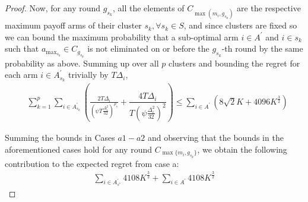\begin{proof}
  Now, for any round $g_{s_{k}}$, all the elements of $C_{\max(m_{i},g_{s_{k}})}$ are the respective maximum payoff arms of their cluster $s_{k}, \forall s_{k}\in S$, and since clusters are fixed so we can bound the maximum probability that a sub-optimal arm ${i}\in A^{'}$  and ${i}\in s_{k}$ such that $a_{\max_{s_{k}}}\in C_{g_{s_{k}}}$ is not eliminated on or before the $g_{s_{k}}$-th round by the same probability as above. Summing up over all $p$ clusters and bounding the regret for each arm $i\in A_{s_{k}}^{'}$ trivially by $T\Delta_{i}$,
 \begin{align*}
 &\sum_{k=1}^{p}\sum_{i\in A_{s_{k}}^{'}}\left(\frac{2T\Delta_{i}}{(\psi T\frac{\Delta_{i}^{2}}{32})^{\rho_{s}}} + \dfrac{4T\Delta_{i}}{T(\psi \frac{\Delta_{i}^{2}}{32})^2}\right)\leq \sum_{i\in A^{'}}\left(8\sqrt{2} K + 4096 K^{\frac{3}{2}}\right)
 \end{align*}


Summing the bounds in Cases $a1-a2$ and observing that the bounds in the aforementioned cases hold for any round $C_{\max \lbrace m_i,g_{s_k}\rbrace}$, we obtain the following contribution to the expected regret from case a:
\begin{align*}
 \sum_{i\in A_{s^*}^{'}} 4108 K^{\frac{3}{2}} + \sum_{i\in A^{'}} 4108 K^{\frac{3}{2}}
\end{align*}


\end{proof}
